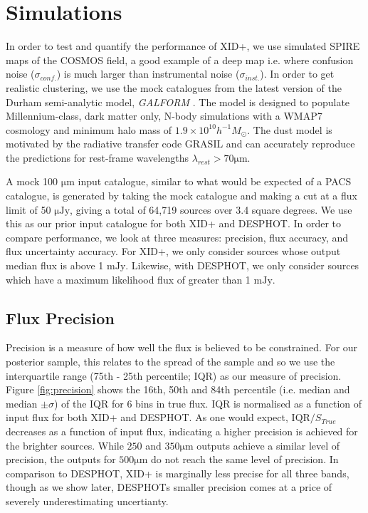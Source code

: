 \documentclass[useAMS,usenatbib]{mnras}
\begin{document}
\section{Simulations}\label{sec:sims}
In order to test and quantify the performance of XID+, we use simulated SPIRE maps of the COSMOS field, a good example of a deep map i.e. where confusion noise ($\sigma_{conf.}$) is much larger than instrumental noise ($\sigma_{inst.}$). In order to get realistic clustering, we use the mock catalogues from the latest version of the Durham semi-analytic model, \emph{GALFORM} \citep{Lacey:2015,Cowley:2014}. The model is designed to populate Millennium-class, dark matter only, N-body simulations with a WMAP7 cosmology and minimum halo mass of $1.9 \times 10^{10} h^{-1} M_{\odot}$. The dust model is motivated by the radiative transfer code GRASIL \citep{Silva:1998} and can accurately reproduce the predictions for rest-frame wavelengths $\lambda_{rest} > 70 \mathrm{\mu m}$.

A mock 100 $\mathrm{\mu m}$ input catalogue, similar to what would be expected of a PACS catalogue, is generated by taking the mock catalogue and making a cut at a flux limit of 50 $\mathrm{\mu Jy}$, giving a total of 64,719 sources over 3.4 square degrees. We use this as our prior input catalogue for both \textsc{XID+} and \textsc{DESPHOT}. In order to compare performance, we look at three measures: precision, flux accuracy, and flux uncertainty accuracy. For \textsc{XID+}, we only consider sources whose output median flux is above 1 $\mathrm{mJy}$. Likewise, with \textsc{DESPHOT}, we only consider sources which have a maximum likelihood flux of greater than 1 $\mathrm{mJy}$. 

\subsection{Flux Precision}
Precision is a measure of how well the flux is believed to be constrained. For our posterior sample, this relates to the spread of the sample and so we use the interquartile range (75th - 25th percentile; IQR) as our measure of precision. Figure \ref{fig:precision} shows the 16th, 50th and 84th percentile (i.e. median and median $\pm \sigma$) of the IQR for 6 bins in true flux. IQR is normalised as a function of input flux for both \textsc{XID+} and \textsc{DESPHOT}. As one would expect, $\mathrm{IQR}/S_{True}$ decreases as a function of input flux, indicating a higher precision is achieved for the brighter sources. While $250$ and $350\mathrm{\mu m}$ outputs achieve a similar level of precision, the outputs for $500 \mathrm{\mu m}$ do not reach the same level of precision. In comparison to \textsc{DESPHOT}, \textsc{XID+} is marginally less precise for all three bands, though as we show later, \textsc{DESPHOT}s smaller precision comes at a price of severely underestimating uncertianty. 
\end{document}
